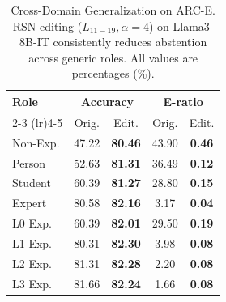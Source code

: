 \documentclass{article}
\begin{document}
\begin{table}[htbp]
\centering
\caption{Cross-Domain Generalization on ARC-E. RSN editing ($L_{11-19}, \alpha{=}4$) on Llama3-8B-IT consistently reduces abstention across generic roles. All values are percentages (\%).}
\label{tab:arc-results}
\setlength{\tabcolsep}{6pt}
\renewcommand{\arraystretch}{0.95}
\small
\begin{tabular}{l c c c c}
\toprule
\textbf{Role}
& \multicolumn{2}{c}{\textbf{Accuracy}} 
& \multicolumn{2}{c}{\textbf{E-ratio}} \\
\cmidrule(lr){2-3} \cmidrule(lr){4-5}
& Orig. & Edit. & Orig. & Edit. \\
\midrule
Non-Exp.   & 47.22 & \textbf{80.46} & 43.90 & \textbf{0.46} \\
Person     & 52.63 & \textbf{81.31} & 36.49 & \textbf{0.12} \\
Student    & 60.39 & \textbf{81.27} & 28.80 & \textbf{0.15} \\
Expert     & 80.58 & \textbf{82.16} &  3.17 & \textbf{0.04} \\
L0 Exp.    & 60.39 & \textbf{82.01} & 29.50 & \textbf{0.19} \\
L1 Exp.    & 80.31 & \textbf{82.30} &  3.98 & \textbf{0.08} \\
L2 Exp.    & 81.31 & \textbf{82.28} &  2.20 & \textbf{0.08} \\
L3 Exp.    & 81.66 & \textbf{82.24} &  1.66 & \textbf{0.08} \\
\bottomrule
\end{tabular}
\end{table}
\end{document}
